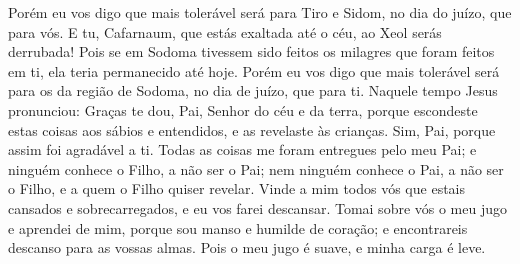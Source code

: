 {  Porém eu vos digo que mais tolerável será para Tiro e Sidom, no dia do juízo, que para vós.
  E tu, Cafarnaum, que estás exaltada até o céu, ao Xeol
 serás derrubada! Pois se em Sodoma tivessem sido feitos os milagres que foram feitos em ti, ela teria permanecido até hoje.
  Porém eu vos digo que mais tolerável será para os da região de Sodoma, no dia de juízo, que para ti.
  Naquele tempo Jesus pronunciou: Graças te dou, Pai, Senhor do céu e da terra, porque escondeste estas coisas aos sábios e entendidos, e as revelaste às crianças.
  Sim, Pai, porque assim foi agradável a ti.
  Todas as coisas me foram entregues pelo meu Pai; e ninguém conhece o Filho, a não ser o Pai; nem ninguém conhece o Pai, a não ser o Filho, e a quem o Filho
{} quiser revelar.
  Vinde a mim todos vós que estais cansados e sobrecarregados, e eu vos farei descansar.
  Tomai sobre vós o meu jugo e aprendei de mim, porque sou manso e humilde de coração; e encontrareis descanso para as vossas almas.
  Pois o meu jugo é suave, e minha carga é leve.
\par }

